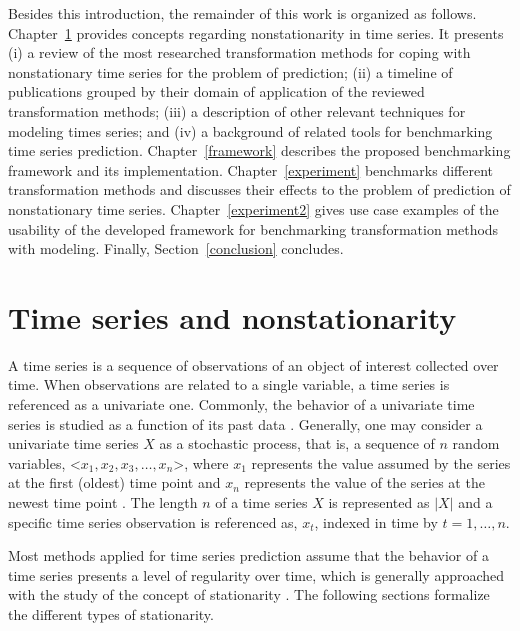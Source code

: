 \documentclass[11pt]{dippg}
\begin{document}
Besides this introduction, the remainder of this work is organized as follows. Chapter~\ref{TSandNonstat} provides concepts regarding nonstationarity in time series. It presents (i) a review of the most researched transformation methods for coping with nonstationary time series for the problem of prediction; (ii) a timeline of publications grouped by their domain of application of the reviewed transformation methods; (iii) a description of other relevant techniques for modeling times series; and (iv) a background of related tools for benchmarking time series prediction. Chapter~\ref{framework} describes the proposed benchmarking framework and its implementation. Chapter~\ref{experiment} benchmarks different transformation methods and discusses their effects to the problem of prediction of nonstationary time series. Chapter~\ref{experiment2} gives use case examples of the usability of the developed framework for benchmarking transformation methods with  modeling. Finally, Section~\ref{conclusion} concludes.

\chapter{Time series and nonstationarity} \label{TSandNonstat}

A time series is a sequence of observations of an object of interest collected over time. When observations are related to a single variable, a time series is referenced as a univariate one. Commonly, the behavior of a univariate time series is studied as a function of its past data \cite{hanssens_market_2003}. Generally, one may consider a univariate time series $X$ as a stochastic process, that is, a sequence of $n$ random variables, \textless$x_1, x_2, x_3, \dots, x_n$\textgreater, where $x_1$ represents the value assumed by the series at the first (oldest) time point and $x_n$ represents the value of the series at the newest time point \cite{esling_time-series_2012,shumway_time_2017}. The length $n$ of a time series $X$ is represented as $|X|$ and a specific time series observation is referenced as, $x_t$, indexed in time by $t = 1, \dots, n$.

Most methods applied for time series prediction assume that the behavior of a time series presents a level of regularity over time, which is generally approached with the study of the concept of stationarity \cite{gujarati_basic_2002,shumway_time_2017}. The following sections formalize the different types of stationarity.
\end{document}
